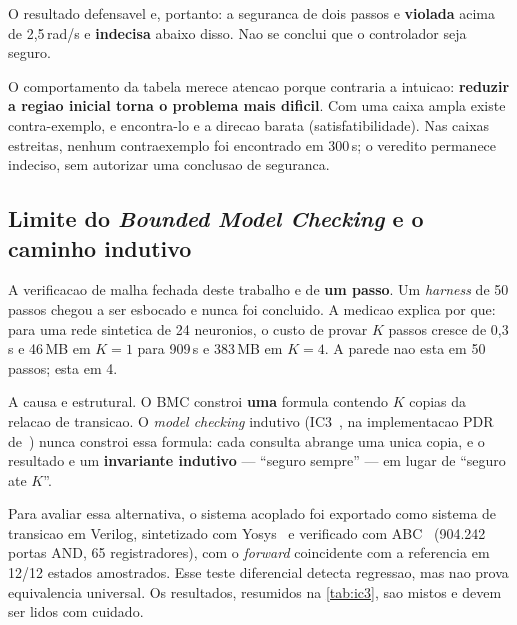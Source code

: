 O resultado defensavel e, portanto: a seguranca de dois passos e \textbf{violada}
acima de 2,5\,rad/s e \textbf{indecisa} abaixo disso. Nao se conclui que o
controlador seja seguro.

O comportamento da tabela merece atencao porque contraria a intuicao: \textbf{reduzir
a regiao inicial torna o problema mais dificil}. Com uma caixa ampla existe
contra-exemplo, e encontra-lo e a direcao barata (satisfatibilidade). Nas caixas
estreitas, nenhum contraexemplo foi encontrado em 300\,s; o veredito permanece
indeciso, sem autorizar uma conclusao de seguranca.

\subsection{Limite do \textit{Bounded Model Checking} e o caminho indutivo}

A verificacao de malha fechada deste trabalho e de \textbf{um passo}. Um
\textit{harness} de 50 passos chegou a ser esbocado e nunca foi concluido. A medicao
explica por que: para uma rede sintetica de 24 neuronios, o custo de provar $K$
passos cresce de 0,3\,s e 46\,MB em $K{=}1$ para 909\,s e 383\,MB em $K{=}4$.
A parede nao esta em 50 passos; esta em 4.

A causa e estrutural. O BMC constroi \textbf{uma} formula contendo $K$ copias da
relacao de transicao. O \textit{model checking} indutivo (IC3~\cite{bradley2011ic3}, na implementacao PDR de~\cite{een2011pdr}) nunca constroi
essa formula: cada consulta abrange uma unica copia, e o resultado e um
\textbf{invariante indutivo} --- ``seguro sempre'' --- em lugar de ``seguro ate
$K$''.

Para avaliar essa alternativa, o sistema acoplado foi exportado como sistema de
transicao em Verilog, sintetizado com Yosys~\cite{wolf2016yosys} e verificado com
ABC~\cite{brayton2010abc} (904.242 portas AND, 65 registradores), com o
\textit{forward} coincidente com a referencia em 12/12 estados amostrados. Esse
teste diferencial detecta regressao, mas nao prova equivalencia universal. Os
resultados, resumidos na \autoref{tab:ic3}, sao mistos e devem ser lidos com
cuidado.

